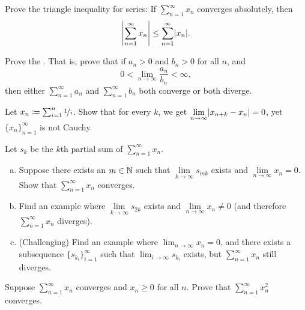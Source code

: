 \begin{exercise}
Prove the triangle inequality for series:
If $\sum_{n=1}^\infty x_n$ converges absolutely, then
\begin{equation*}
\left\lvert {\sum_{n=1}^\infty x_n} \right\rvert \leq
\sum_{n=1}^\infty \lvert {x_n} \rvert .
\end{equation*}
\end{exercise}

\begin{exercise}
Prove the \emph{}.  That is, prove that if
$a_n > 0$ and $b_n > 0$ for all $n$, and
\begin{equation*}
0 < \lim_{n\to\infty} \frac{a_n}{b_n} < \infty ,
\end{equation*}
then either $\sum_{n=1}^\infty a_n$ and $\sum_{n=1}^\infty b_n$ both converge or both diverge.
\end{exercise}

\begin{exercise} \label{exercise:badnocauchy}
Let $x_n \coloneqq \sum_{i=1}^n \nicefrac{1}{i}$.  Show that for every $k$,
we get
$\displaystyle \lim_{n\to\infty} \lvert {x_{n+k}-x_n} \rvert = 0$, yet
$\{ x_n \}_{n=1}^\infty$ is not Cauchy.
\end{exercise}

\begin{samepage}
\begin{exercise}
Let $s_k$ be the $k$th partial sum of $\sum_{n=1}^\infty x_n$.
\begin{enumerate}[a)]
\item
Suppose there exists an $m \in {\mathbb{N}}$ such that $\lim\limits_{k\to\infty}
s_{mk}$ exists and $\lim\limits_{n\to\infty} x_n = 0$.  Show that
$\sum_{n=1}^\infty x_n$ converges.
\item
Find an example where $\lim\limits_{k\to\infty} s_{2k}$ exists and
$\lim\limits_{n\to\infty} x_n \neq 0$ (and therefore $\sum_{n=1}^\infty x_n$ diverges).
\item
(Challenging) Find an example where $\lim_{n\to\infty} x_n = 0$, and there exists
a subsequence $\{ s_{k_i} \}_{i=1}^\infty$ such that $\displaystyle \lim_{i\to\infty} s_{k_i}$ exists,
but $\sum_{n=1}^\infty x_n$ still diverges.
\end{enumerate}
\end{exercise}
\end{samepage}

\begin{exercise} \label{exercise:squareseriesconv}
Suppose $\sum_{n=1}^\infty x_n$ converges and $x_n \geq 0$ for all $n$.
Prove that $\sum_{n=1}^\infty x_n^2$ converges.
\end{exercise}

